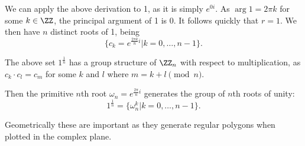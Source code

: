 We can apply the above derivation to 1, as it is simply $e^{0i}$. As $\arg{1} = 2\pi k$ for some $k \in \ZZ$, the principal argument of 1 is 0. It follows quickly that $r=1$. We then have $n$ distinct roots of 1, being 
\[ \{ c_k = e^{\frac{2\pi k}{n} i} | k = 0,\ldots,n-1 \}. \] 


The above set $1^{\frac{1}{n}}$ has a group structure of $\ZZ_n$ with respect to multiplication, as $c_k \cdot c_l = c_m$ for some $k$ and $l$ where $m = k+l \pmod n$. 

Then the primitive $n$th root $\omega_n = e^{\frac{2\pi}{n} i}$ generates the group of $n$th roots of unity: 
\[ 1^{\frac{1}{n}} = \{ \omega_n^k | k = 0, \ldots, n-1 \}. \] 

Geometrically these are important as they generate regular polygons when plotted in the complex plane. 
